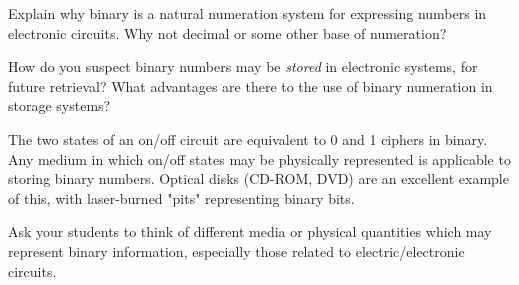 

Explain why binary is a natural numeration system for expressing numbers in electronic circuits.  Why not decimal or some other base of numeration?

How do you suspect binary numbers may be {\it stored} in electronic systems, for future retrieval?  What advantages are there to the use of binary numeration in storage systems?







The two states of an on/off circuit are equivalent to 0 and 1 ciphers in binary.  Any medium in which on/off states may be physically represented is applicable to storing binary numbers.  Optical disks (CD-ROM, DVD) are an excellent example of this, with laser-burned "pits" representing binary bits.







Ask your students to think of different media or physical quantities which may represent binary information, especially those related to electric/electronic circuits.



